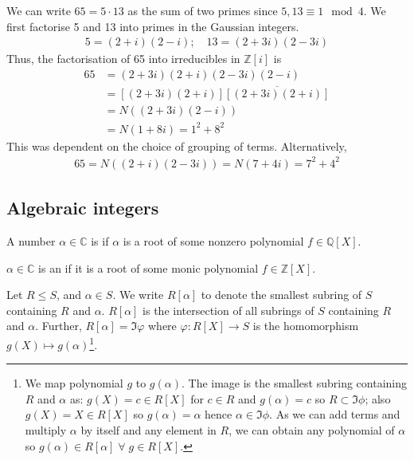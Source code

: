 \begin{example}
	We can write $65 = 5 \cdot 13$ as the sum of two primes since $5, 13 \equiv 1 \mod 4$.
	We first factorise 5 and 13 into primes in the Gaussian integers.
	\begin{align*}
		5 = (2+i)(2-i);\quad 13 = (2+3i)(2-3i)
	\end{align*}
	Thus, the factorisation of 65 into irreducibles in $\mathbb Z[i]$ is
	\begin{align*}
		65 & = (2+3i)(2+i)(2-3i)(2-i)                \\
		   & = [(2+3i)(2+i)]\overline{[(2+3i)(2+i)]} \\
		   & = N((2+3i)(2-i))                        \\
		   & = N(1+8i) = 1^2 + 8^2
	\end{align*}
	This was dependent on the choice of grouping of terms.
	Alternatively,
	\begin{align*}
		65 = N((2+i)(2-3i)) = N(7+4i) = 7^2 + 4^2
	\end{align*}
\end{example}

\subsection{Algebraic integers}
\begin{definition}[Algebraic]
	A number $\alpha \in \mathbb C$ is  if $\alpha$ is a root of some nonzero polynomial $f \in \mathbb Q[X]$.
\end{definition}

\begin{definition}
	$\alpha \in \mathbb{C}$ is an  if it is a root of some monic polynomial $f \in \mathbb Z[X]$.
\end{definition} 

\begin{notation}
	Let $R \leq S$, and $\alpha \in S$.
	We write $R[\alpha]$ to denote the smallest subring of $S$ containing $R$ and $\alpha$.
	$R[\alpha]$ is the intersection of all subrings of $S$ containing $R$ and $\alpha$.
	Further, $R[\alpha] = \Im \varphi$ where $\varphi : R[X] \to S$ is the homomorphism $g(X) \mapsto g(\alpha)$\footnote{We map polynomial $g$ to $g(\alpha)$. 
	The image is the smallest subring containing $R$ and $\alpha$ as: $g(X) = c \in R[X]$ for $c \in R$ and $g(\alpha) = c$ so $R \subset \Im \phi$; also $g(X) = X \in R[X]$ so $g(\alpha) = \alpha$ hence $\alpha \in \Im \phi$. 
	As we can add terms and multiply $\alpha$ by itself and any element in $R$, we can obtain any polynomial of $\alpha$ so $g(\alpha) \in R[\alpha] \; \forall \; g \in R[X]$.}.
\end{notation} 

